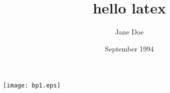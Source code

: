 \documentclass[a4paper,12pt]{article}
\title{hello latex}
\author{Jane Doe}
\date{September 1994}
\begin{document}
	\maketitle

\texttt{[image: bp1.eps]}
\end{document}
